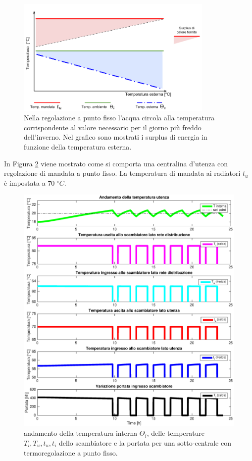 \documentclass[laurea,oneside,11pt]{USiena_tesiLM3}
\begin{document}
\begin{figure}[!ht]
\centering
\includegraphics[width=0.85\textwidth]{figure/surplus} 
\caption{Nella regolazione a punto fisso l'acqua circola alla temperatura corrispondente al valore necessario per il giorno più freddo dell'inverno. Nel grafico sono mostrati i surplus di energia in funzione della temperatura esterna.}
\label{fig:surplus}
\end{figure}

In Figura \ref{fig:reg_mandata} viene mostrato come si comporta una centralina d'utenza con regolazione di mandata a punto fisso. La temperatura di mandata ai radiatori $t_u$ è impostata a 70  $^{\circ}C$.  

\begin{figure}[!ht]
\centering
\includegraphics[width=\textwidth]{figure/reg_mandata} 
\caption{andamento della temperatura interna $\Theta_i$, delle temperature $T_i, T_u, t_u, t_i$ dello scambiatore e la portata per una sotto-centrale con termoregolazione a punto fisso.}
\label{fig:reg_mandata}
\end{figure}
\end{document}
